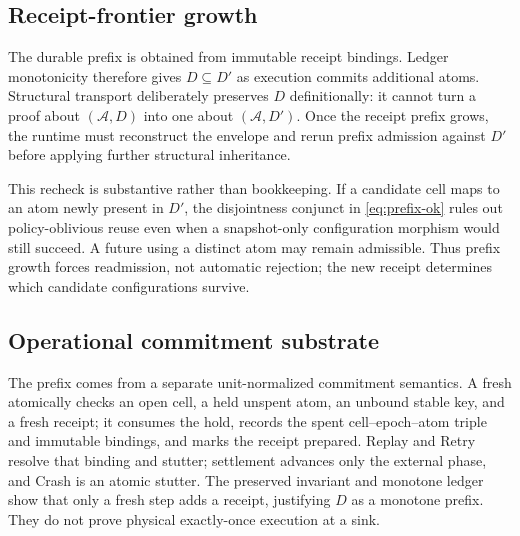 \subsection{Receipt-frontier growth}

The durable prefix is obtained from immutable receipt bindings.  Ledger
monotonicity therefore gives $D\subseteq D'$ as execution commits additional
atoms.  Structural transport deliberately preserves $D$ definitionally: it
cannot turn a proof about $(\mathcal A,D)$ into one about
$(\mathcal A,D')$.  Once the receipt prefix grows, the runtime must reconstruct
the envelope and rerun prefix admission against $D'$ before applying further
structural inheritance.

This recheck is substantive rather than bookkeeping.  If a candidate cell
maps to an atom newly present in $D'$, the disjointness conjunct in
\cref{eq:prefix-ok} rules out policy-oblivious reuse even when a snapshot-only
configuration morphism would still succeed.  A future using a distinct atom
may remain admissible.  Thus prefix growth forces readmission, not automatic
rejection; the new receipt determines which candidate configurations survive.

\subsection{Operational commitment substrate}

The prefix comes from a separate unit-normalized commitment semantics.  A
fresh \Prepare{} atomically checks an open cell, a held unspent atom, an unbound
stable key, and a fresh receipt; it consumes the hold, records the spent
cell--epoch--atom triple and immutable bindings, and marks the receipt prepared.
Replay and Retry resolve that binding and stutter; settlement advances only the
external phase, and Crash is an atomic stutter.  The preserved invariant and
monotone ledger show that only a fresh step adds a receipt, justifying $D$ as a
monotone prefix.  They do not prove physical exactly-once execution at a sink.
